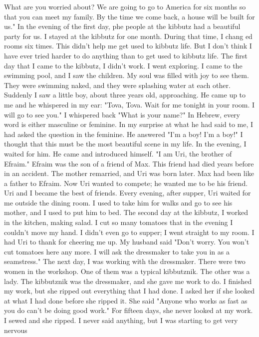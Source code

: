 What are you worried about?
We are going to go to America for 
six months so that you can meet my family.
By the time we come back, 
a house will be built for us."
In the evening of the first day, phe 
people at the kibbutz had a beautiful party for us.
I stayed at the kibbutz for one month.
During that time, I chang 
ed rooms six times.
This didn't help me get used to kibbutz life.
But 
I don't think I have ever tried harder to do anything than to get used 
to kibbutz life.
The first day that I came to the kibbutz, I didn't work.
I 
went exploring.
I came to the swimming pool, and I saw the children.
My soul was filled with joy to see them.
They were swimming naked, 
and they were splashing water at each other.
Suddenly I saw a little 
boy, about three years old, approaching.
He came up to me and he whispered in my ear: "Tova, Tova.
Wait for me tonight in your room.
I 
will go to see you."
I whispered back "What is your name?"
In Hebrew, every word is either masculine or feminine.
In my surprise at 
what he had said to me, I had asked the question in the feminine.
He 
answered "I'm a boy!
I'm a boy!"
I thought that this must be the most 
beautiful scene in my life.
In the evening, I waited for him.
He came and introduced himself.
"I am Uri, the brother of Efraim."
Efraim was the son of a friend of 
Max.
This friend had died years before in an accident.
The mother remarried, and Uri was born later.
Max had been like a father to Efraim.
Now Uri wanted to compete; he wanted me to be his friend.
Uri and I 
became the best of friends.
Every evening, after supper, Uri waited for 
me outside the dining room.
I used to take him for walks and go to see 
his mother, and I used to put him to bed.
The second day at the kibbutz, I worked in the kitchen, making 
salad.
I cut so many tomatoes that in the evening I couldn't move my 
hand.
I didn't even go to supper; I went straight to my room.
I had 
Uri to thank for cheering me up.
My husband said "Don't worry.
You 
won't cut tomatoes here any more.
I will ask the dressmaker to take you 
in as a seamstress."
The next day, I was working with the dressmaker.
There were two 
women in the workshop.
One of them was a typical kibbutznik.
The other 
was a lady.
The kibbutznik was the dressmaker, and she gave me work 
to do.
I finished my work, but she ripped out everything that I had 
done.
I asked her if she looked at what I had done before she ripped 
it.
She said "Anyone who works as fast as you do can't be doing good 
work."
For fifteen days, she never looked at my work.
I sewed and she 
ripped.
I never said anything, but I was starting to get very nervous 
